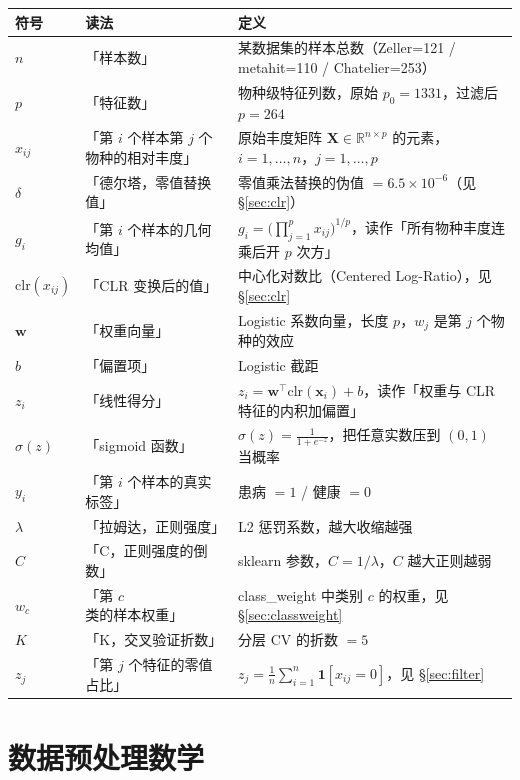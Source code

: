 \documentclass{internal-report}
\begin{document}
\begin{center}
\footnotesize
\begin{tabular}{lll}
\toprule
符号 & 读法 & 定义 \\
\midrule
$n$ & 「样本数」 & 某数据集的样本总数（Zeller=121 / metahit=110 / Chatelier=253） \\
$p$ & 「特征数」 & 物种级特征列数，原始 $p_0=1331$，过滤后 $p=264$ \\
$x_{ij}$ & 「第 $i$ 个样本第 $j$ 个物种的相对丰度」 & 原始丰度矩阵 $\mathbf{X}\in\mathbb{R}^{n\times p}$ 的元素，$i=1,\dots,n$，$j=1,\dots,p$ \\
$\delta$ & 「德尔塔，零值替换值」 & 零值乘法替换的伪值 $=6.5\times10^{-6}$（见 \S\ref{sec:clr}） \\
$g_i$ & 「第 $i$ 个样本的几何均值」 & $g_i=\big(\prod_{j=1}^{p}x_{ij}\big)^{1/p}$，读作「所有物种丰度连乘后开 $p$ 次方」 \\
$\mathrm{clr}(x_{ij})$ & 「CLR 变换后的值」 & 中心化对数比（Centered Log-Ratio），见 \S\ref{sec:clr} \\
$\mathbf{w}$ & 「权重向量」 & Logistic 系数向量，长度 $p$，$w_j$ 是第 $j$ 个物种的效应 \\
$b$ & 「偏置项」 & Logistic 截距 \\
$z_i$ & 「线性得分」 & $z_i=\mathbf{w}^{\top}\mathrm{clr}(\mathbf{x}_i)+b$，读作「权重与 CLR 特征的内积加偏置」 \\
$\sigma(z)$ & 「sigmoid 函数」 & $\sigma(z)=\frac{1}{1+e^{-z}}$，把任意实数压到 $(0,1)$ 当概率 \\
$y_i$ & 「第 $i$ 个样本的真实标签」 & 患病 $=1$ / 健康 $=0$ \\
$\lambda$ & 「拉姆达，正则强度」 & L2 惩罚系数，越大收缩越强 \\
$C$ & 「C，正则强度的倒数」 & sklearn 参数，$C=1/\lambda$，$C$ 越大正则越弱 \\
$w_c$ & 「第 $c$ 类的样本权重」 & class\_weight 中类别 $c$ 的权重，见 \S\ref{sec:classweight} \\
$K$ & 「K，交叉验证折数」 & 分层 CV 的折数 $=5$ \\
$z_j$ & 「第 $j$ 个特征的零值占比」 & $z_j=\frac{1}{n}\sum_{i=1}^{n}\mathbf{1}[x_{ij}=0]$，见 \S\ref{sec:filter} \\
\bottomrule
\end{tabular}
\end{center}

\section{数据预处理数学}
\label{sec:preprocess}
\end{document}
